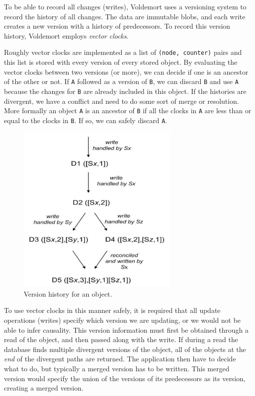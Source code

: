To be able to record all changes (writes), Voldemort uses a versioning system to record the history of all changes. The data are immutable blobs, and each write creates a new version with a history of predecessors.
To record this version history, Voldemort employs \emph{vector clocks}.

Roughly vector clocks are implemented as a list of \texttt{(node, counter)} pairs and this list is stored with every version of every stored object.
By evaluating the vector clocks between two versions (or more), we can decide if one is an ancestor of the other or not. If \texttt{A} followed as a version of \texttt{B}, we can discard \texttt{B} and use \texttt{A} because the changes for \texttt{B} are already included in this object. 
If the histories are divergent, we have a conflict and need to do some sort of merge or resolution. More formally an object \texttt{A} is an ancestor of \texttt{B} if all the clocks in \texttt{A} are less than or equal to the clocks in \texttt{B}. 
If so, we can safely discard \texttt{A}.

\begin{figure}[h]
    \centering
    \includegraphics[width=0.7\textwidth]{background/figures/versioning}
    \caption{Version history for an object\cite{voldemort}.}
    \label{fig:versioning}
\end{figure}

To use vector clocks in this manner safely, it is required that all update operations (writes) specify which version we are updating, or we would not be able to infer causality.
This version information must first be obtained through a read of the object, and then passed along with the write.
If during a read the database finds multiple divergent versions of the object, all of the objects at the \emph{end} of the divergent paths are returned.
The application then have to decide what to do, but typically a merged version has to be written. This merged version would specify the union of the versions of its predecessors as its version, creating a merged version.

